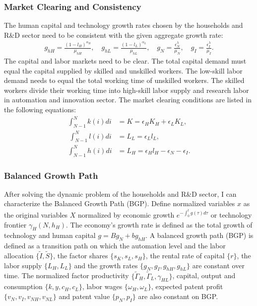 \documentclass[12pt]{article}
\begin{document}
\subsubsection*{Market Clearing and Consistency}
The human capital and technology growth rates chosen by the households and R\&D sector need to be consistent with the given aggregate growth rate:
\begin{align*}
g_{hH} = \frac{(1-l_H)^{\alpha_H}}{\mu_{hH}}, \quad g_{hL} = \frac{(1-l_L)^{\alpha_L}}{\mu_{hL}}, \quad g_N = \frac{\epsilon_N^{\lambda}}{\mu_N}, \quad g_I = \frac{\epsilon_I^{\lambda}}{\mu_I}.
\end{align*}
The capital and labor markets need to be clear. The total capital demand must equal the capital supplied by skilled and unskilled workers. The low-skill labor demand needs to equal the total working time of unskilled workers. The skilled workers divide their working time into high-skill labor supply and research labor in automation and innovation sector. The market clearing conditions are listed in the following equations: 
\begin{align*}
\int_{N-1}^N k(i) di &= K = \epsilon_H K_H + \epsilon_L K_L, \\\
\int_{N-1}^N l(i) di &= L_L = \epsilon_L l_L,\\
\int_{N-1}^N h(i) di &= L_H = \epsilon_H l_H-\epsilon_N-\epsilon_I.
\end{align*}

\subsubsection*{Balanced Growth Path}
After solving the dynamic problem of the households and R\&D sector, I can characterize the Balanced Growth Path (BGP). Define normalized variables $x$ as the original variables $X$ normalized by economic growth $e^{-\int_0^{t}g(\tau)d\tau}$ or technology frontier $\gamma_H(N,h_H)$. The economy's growth rate is defined as the total growth of technology and human capital $g = Bg_N+bg_{hH}$. A balanced growth path (BGP) is defined as a transition path on which the automation level and the labor allocation $\{\tilde{I},\tilde{S}\}$, the factor shares $\{s_K,s_L, s_H\}$, the rental rate of capital $\{r\}$, the labor supply $\{L_H, L_L\}$ and the growth rates $\{g_N, g_I, g_{hH},g_{hL}\}$ are constant over time. The normalized factor productivity $\{\tilde{\Gamma}_H, \tilde{\Gamma}_L, \gamma_{HL}\}$, capital, output and consumption $\{k, y, c_H, c_L\}$, labor wages $\{\omega_H, \omega_L\}$, expected patent profit $\{v_N,v_I,v_{NH},v_{NL}\}$ and patent value $\{p_N, p_I\}$ are also constant on BGP.
\end{document}
